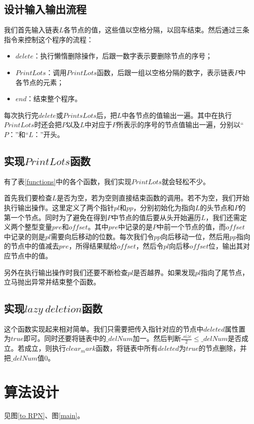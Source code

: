 \documentclass[UTF8]{ctexart}
\begin{document}
		
		\subsection{设计输入输出流程}\label{design_input_and_output}
		\indent 我们首先输入链表$L$各节点的值，这些值以空格分隔，以回车结束。然后通过三条指令来控制这个程序的流程：
			\begin{itemize}[leftmargin=50pt]
			\item $delete$：执行懒惰删除操作，后跟一数字表示要删除节点的序号；
			\item $PrintLots$：调用$PrintLots$函数，后跟一组以空格分隔的数字，表示链表$P$中各节点的元素；
			\item $end$：结束整个程序。
			\end{itemize}
			
		\indent 每次执行完$delete$或$PrintsLots$后，把$L$中各节点的值输出一遍。其中在执行$PrintLots$时还会把$P$以及$L$中对应于$P$所表示的序号的节点值输出一遍，分别以“$P：$”和“$L：$”开头。
		
		\subsection{实现$PrintLots$函数}\label{PrintLots}
		\indent 有了表\ref{functions}中的各个函数，我们实现$PrintLots$就会轻松不少。
		
		\indent 首先我们要检查$L$是否为空，若为空则直接结束函数的调用。若不为空，我们开始执行输出操作。这里定义了两个指针$pl$和$pp$，分别初始化为指向$L$的头节点和$P$的第一个节点。同时为了避免在得到$P$中节点的值后要从头开始遍历$L$，我们还需定义两个整型变量$pre$和$offset$。其中$pre$中记录的是$P$中前一个节点的值，而$offset$中记录的则是$pl$需要向后移动的位数。每次我们令$pp$向后移动一位，然后用$pp$指向的节点中的值减去$pre$，所得结果赋给$offset$，然后令$pl$向后移$offset$位，输出其对应节点中的值。
		
		\indent 另外在执行输出操作时我们还要不断检查$pl$是否越界。如果发现$pl$指向了尾节点，立马抛出异常并结束整个函数。
		\subsection{实现$lazy\ deletion$函数}\label{lazy_del}
		\indent 这个函数实现起来相对简单。我们只需要把传入指针对应的节点中$deleted$属性置为$true$即可。同时还要将链表中的$\_delNum$加一。然后判断$\frac{\_size}{2} \leq \_delNum$是否成立。若成立，则执行$clear_mark$函数，将链表中所有$deleted$为$true$的节点删除，并把$\_delNum$值$0$。
	\section{算法设计}
	见图\ref{to RPN}、图\ref{main}。
\end{document}
